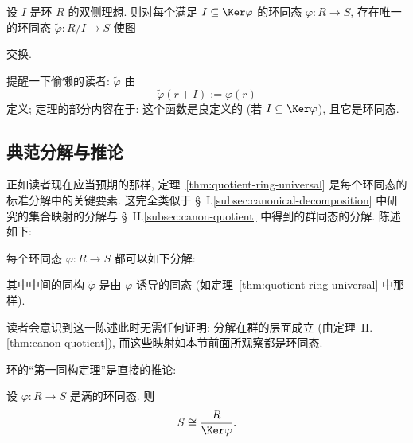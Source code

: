 \begin{theorem}
\label{thm:quotient-ring-universal}
设 $I$ 是环 $R$ 的双侧理想. 则对每个满足 $I \subseteq \Ker \varphi$ 的环同态 $\varphi : R \to S$, 存在唯一的环同态 $\tilde{\varphi} : R/I \to S$ 使图
\begin{center}
\end{center}
交换.

提醒一下偷懒的读者: $\tilde{\varphi}$ 由
\[
\tilde{\varphi}(r + I) := \varphi(r)
\]
定义; 定理的部分内容在于: 这个函数是良定义的 (若 $I \subseteq \Ker \varphi$), 且它是环同态.
\end{theorem}

\subsection{典范分解与推论}
\label{subsec:ring-canonical}

正如读者现在应当预期的那样, 定理~\ref{thm:quotient-ring-universal} 是每个环同态的标准分解中的关键要素. 这完全类似于 \S~I.\ref{subsec:canonical-decomposition} 中研究的集合映射的分解与 \S~II.\ref{subsec:canon-quotient} 中得到的群同态的分解. 陈述如下:

\begin{theorem}
\label{thm:ring-canonical}
每个环同态 $\varphi : R \to S$ 都可以如下分解:
\begin{center}
\end{center}
其中中间的同构 $\tilde{\varphi}$ 是由 $\varphi$ 诱导的同态 (如定理~\ref{thm:quotient-ring-universal} 中那样).
\end{theorem}

读者会意识到这一陈述此时无需任何证明: 分解在群的层面成立 (由定理~II.\ref{thm:canon-quotient}), 而这些映射如本节前面所观察都是环同态.

环的``第一同构定理''是直接的推论:

\begin{corollary}
\label{cor:ring-first-iso}
设 $\varphi : R \to S$ 是满的环同态. 则
\[
S \cong \frac{R}{\Ker \varphi}.
\]
\end{corollary}

